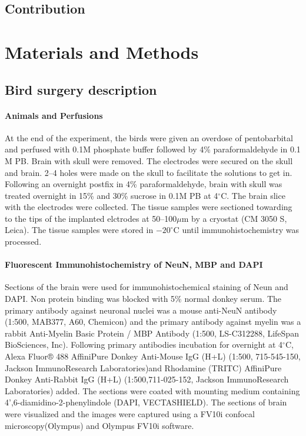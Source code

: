 \documentclass[10pt,letterpaper]{article}
\renewcommand{\subsubsection}[1]{\paragraph{#1}}
\begin{document}
\subsection{Contribution}



\section{Materials and Methods}

\subsection{Bird surgery description}

\subsubsection{Animals and Perfusions}

At the end of the experiment, the birds were given an overdose of pentobarbital and perfused with 0.1M phosphate buffer followed by 4\% paraformaldehyde in 0.1 M PB.
Brain with skull were removed. The electrodes were secured on the skull and brain. 2--4 holes were made on the skull to facilitate the solutions to get in. Following an overnight postfix in 4\% paraformaldehyde, brain with skull was treated overnight in 15\% and 30\% sucrose in 0.1M PB at 4$^\circ$C.  The brain slice with the electrodes were collected. The tissue samples were sectioned towarding to the tips of the implanted elctrodes at 50--100$\mu$m by a cryostat (CM 3050 S, Leica). The tissue samples were stored in $-20^\circ$C until immunohistochemistry was processed.

\subsubsection{Fluorescent Immunohistochemistry of NeuN, MBP and DAPI}

Sections of the brain were used for immunohistochemical staining of Neun and DAPI. Non protein binding was blocked with 5\% normal donkey serum. The primary antibody against neuronal nuclei was a mouse anti-NeuN antibody (1:500, MAB377, A60, Chemicon) and the primary antibody against myelin was a rabbit Anti-Myelin Basic Protein / MBP Antibody (1:500, LS-C312288, LifeSpan BioSciences, Inc). Following primary antibodies incubation for overnight at 4$^\circ$C, Alexa Fluor® 488 AffiniPure Donkey Anti-Mouse IgG (H+L) (1:500, 715-545-150, Jackson ImmunoResearch Laboratories)and Rhodamine (TRITC) AffiniPure Donkey Anti-Rabbit IgG (H+L) (1:500,711-025-152, Jackson ImmunoResearch Laboratories) added. The sections were coated with mounting medium containing 4',6-diamidino-2-phenylindole (DAPI, VECTASHIELD).  The sections of brain were visualized and the images were captured using a FV10i confocal microscopy(Olympus) and Olympus FV10i software.
\end{document}
